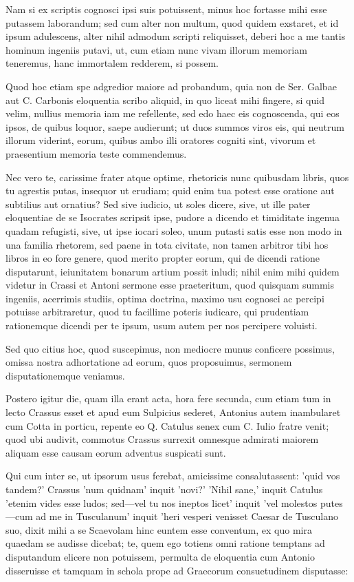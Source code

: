  Nam si ex scriptis cognosci ipsi suis potuissent, minus hoc fortasse mihi esse putassem laborandum; sed cum alter non multum, quod quidem exstaret, et id ipsum adulescens, alter nihil admodum scripti reliquisset, deberi hoc a me tantis hominum ingeniis putavi, ut, cum etiam nunc vivam illorum memoriam teneremus, hanc immortalem redderem, si possem.

 Quod hoc etiam spe adgredior maiore ad probandum, quia non de Ser. Galbae aut C. Carbonis eloquentia scribo aliquid, in quo liceat mihi fingere, si quid velim, nullius memoria iam me refellente, sed edo haec eis cognoscenda, qui eos ipsos, de quibus loquor, saepe audierunt; ut duos summos viros eis, qui neutrum illorum viderint, eorum, quibus ambo illi oratores cogniti sint, vivorum et praesentium memoria teste commendemus.

 Nec vero te, carissime frater atque optime, rhetoricis nunc quibusdam libris, quos tu agrestis putas, insequor ut erudiam; quid enim tua potest esse oratione aut subtilius aut ornatius? Sed sive iudicio, ut soles dicere, sive, ut ille pater eloquentiae de se Isocrates scripsit ipse, pudore a dicendo et timiditate ingenua quadam refugisti, sive, ut ipse iocari soleo, unum putasti satis esse non modo in una familia rhetorem, sed paene in tota civitate, non tamen arbitror tibi hos libros in eo fore genere, quod merito propter eorum, qui de dicendi ratione disputarunt, ieiunitatem bonarum artium possit inludi; nihil enim mihi quidem videtur in Crassi et Antoni sermone esse praeteritum, quod quisquam summis ingeniis, acerrimis studiis, optima doctrina, maximo usu cognosci ac percipi potuisse arbitraretur, quod tu facillime poteris iudicare, qui prudentiam rationemque dicendi per te ipsum, usum autem per nos percipere voluisti.

 Sed quo citius hoc, quod suscepimus, non mediocre munus conficere possimus, omissa nostra adhortatione ad eorum, quos proposuimus, sermonem disputationemque veniamus.

 Postero igitur die, quam illa erant acta, hora fere secunda, cum etiam tum in lecto Crassus esset et apud eum Sulpicius sederet, Antonius autem inambularet cum Cotta in porticu, repente eo Q. Catulus senex cum C. Iulio fratre venit; quod ubi audivit, commotus Crassus surrexit omnesque admirati maiorem aliquam esse causam eorum adventus suspicati sunt.

 Qui cum inter se, ut ipsorum usus ferebat, amicissime consalutassent: 'quid vos tandem?' Crassus 'num quidnam' inquit 'novi?' 'Nihil sane,' inquit Catulus 'etenim vides esse ludos; sed—vel tu nos ineptos licet' inquit 'vel molestos putes—cum ad me in Tusculanum' inquit 'heri vesperi venisset Caesar de Tusculano suo, dixit mihi a se Scaevolam hinc euntem esse conventum, ex quo mira quaedam se audisse dicebat; te, quem ego totiens omni ratione temptans ad disputandum elicere non potuissem, permulta de eloquentia cum Antonio disseruisse et tamquam in schola prope ad Graecorum consuetudinem disputasse:

